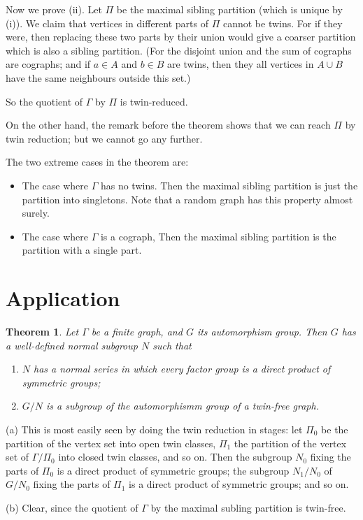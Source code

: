 \documentclass[12pt]{article}
\newtheorem{theorem}{Theorem}[section]
\newenvironment{proof}{\prepf\rm}{\endprepf}
\begin{document}
\begin{proof}
Now we prove (ii). Let $\Pi$ be the maximal sibling partition (which is unique
by (i)). We claim that vertices
in different parts of $\Pi$ cannot be twins. For if they were, then replacing
these two parts by their union would give a coarser partition which is also a
sibling partition. (For the disjoint union and the sum of cographs are cographs;
and if $a\in A$ and $b\in B$ are twins, then they all vertices in $A\cup B$
have the same neighbours outside this set.)

So the quotient of $\Gamma$ by $\Pi$ is twin-reduced.

On the other hand, the remark before the theorem shows that we can reach $\Pi$
by twin reduction; but we cannot go any further.
\end{proof}

The two extreme cases in the theorem are:
\begin{itemize}
\item The case where $\Gamma$ has no twins. Then the maximal sibling partition
is just the partition into singletons. Note that a random graph has this
property almost surely.
\item The case where $\Gamma$ is a cograph, Then the maximal sibling partition
is the partition with a single part.
\end{itemize}

\section{Application}

\begin{theorem} 
Let $\Gamma$ be a finite graph, and $G$ its automorphism group. Then $G$ has
a well-defined normal subgroup $N$ such that
\begin{enumerate}
\item $N$ has a normal series in which every factor group is a direct product
of symmetric groups;
\item $G/N$ is a subgroup of the automorphismm group of a twin-free graph.
\end{enumerate}
\end{theorem}

\begin{proof}
(a) This is most easily seen by doing the twin reduction in stages: let
$\Pi_0$ be the partition of the vertex set into open twin classes, $\Pi_1$
the partition of the vertex set of $\Gamma/\Pi_0$ into closed twin classes,
and so on. Then the subgroup $N_0$ fixing the parts of $\Pi_0$ is a direct 
product of symmetric groups; the subgroup $N_1/N_0$ of $G/N_0$ fixing the 
parts of $\Pi_1$ is a direct product of symmetric groups; and so on.

\medskip

(b) Clear, since the quotient of $\Gamma$ by the maximal subling partition is
twin-free.
\end{proof}
\end{document}
